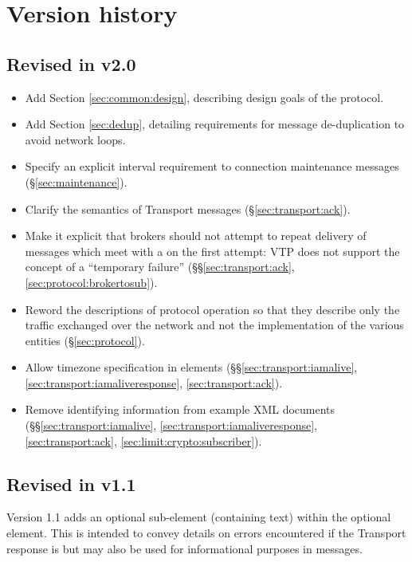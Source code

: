 \documentclass[a4paper,11pt]{ivoa}
\begin{document}
\section{Version history}

\subsection{Revised in v2.0}

\begin{itemize}
    \item{Add Section \ref{sec:common:design}, describing design goals of the
    protocol.}

    \item{Add Section \ref{sec:dedup}, detailing requirements for message
    de-duplication to avoid network loops.}

    \item{Specify an explicit interval requirement to connection maintenance
    messages (\S\ref{sec:maintenance}).}

    \item{Clarify the semantics of  Transport messages
    (\S\ref{sec:transport:ack}).}

    \item{Make it explicit that brokers should not attempt to repeat delivery
    of messages which meet with a  on the first attempt: VTP does
    not support the concept of a ``temporary failure''
    (\S\S\ref{sec:transport:ack}, \ref{sec:protocol:brokertosub}).}

    \item{Reword the descriptions of protocol operation so that they describe
    only the traffic exchanged over the network and not the implementation of
    the various entities (\S\ref{sec:protocol}).}

    \item{Allow timezone specification in 
     elements (\S\S\ref{sec:transport:iamalive},
    \ref{sec:transport:iamaliveresponse}, \ref{sec:transport:ack}).}

    \item{Remove identifying information from example XML documents
    (\S\S\ref{sec:transport:iamalive}, \ref{sec:transport:iamaliveresponse},
    \ref{sec:transport:ack}, \ref{sec:limit:crypto:subscriber}).}
\end{itemize}

\subsection{Revised in v1.1}

Version 1.1 adds an optional  sub-element (containing text)
within the optional  element. This is intended to convey
details on errors encountered if the Transport response is  but
may also be used for informational purposes in  messages.


\end{document}
